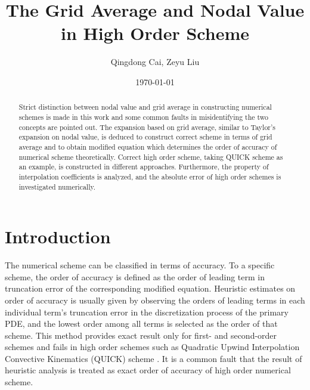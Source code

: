 \documentclass[]{article}
\title{The Grid Average and Nodal Value in High Order Scheme}
\author{Qingdong Cai, Zeyu Liu}
\date{\today}
\begin{document}
\maketitle
\begin{abstract}
  Strict distinction between nodal value and grid average in constructing
  numerical schemes is made in this work and some common faults in
  misidentifying the two concepts are pointed out. 
  The expansion based on grid average,
  similar to Taylor's expansion on nodal value, is deduced to construct
  correct scheme in terms of grid average and to obtain modified equation
  which determines the order of accuracy of numerical scheme theoretically.
  Correct high order scheme, taking QUICK scheme as an example, is constructed in different
  approaches. Furthermore, the property of interpolation coefficients is analyzed, and
  the absolute error of high order schemes is investigated numerically. 
\end{abstract}
\tableofcontents

\section{Introduction}
\label{sec:intro}

The numerical scheme can be classified in terms of accuracy. To a 
specific scheme, the order of accuracy is defined as the order of leading term
in truncation error of the corresponding modified equation. Heuristic estimates on
order of accuracy is usually given by observing the orders of leading terms in
each individual term's truncation error in the discretization process of the
primary PDE, and the lowest order among all terms is selected as the order of that
scheme. This method provides exact result only for first- and second-order 
schemes and fails in high order schemes such as Quadratic Upwind Interpolation
Convective Kinematics (QUICK) scheme \cite{leonard1979stable}.
It is a common fault that the result of heuristic analysis is treated as exact
order of accuracy of high order numerical scheme.
\end{document}
